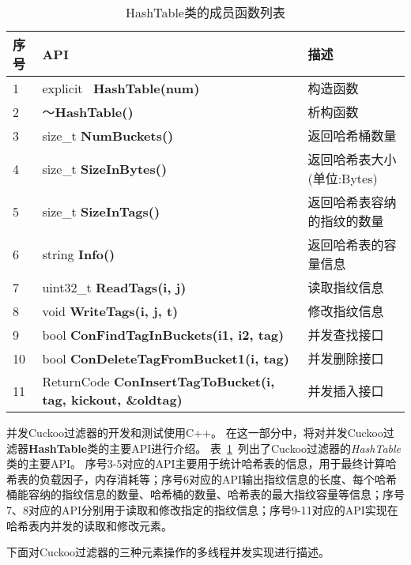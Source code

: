 \begin{table}[htbp]
  \caption{HashTable类的成员函数列表}
\label{tab:cbf_API}
\footnotesize
\centering
\begin{tabular}{lll}
\toprule
序号&API &   描述  \\
\midrule
1	&	explicit ~\textbf{HashTable(num)}									 	&  	构造函数\\
2	&	 ～\textbf{HashTable()}  									& 	析构函数\\
3	&	size\_t  \textbf{NumBuckets()} 									&  	返回哈希桶数量\\
4	&	size\_t  \textbf{SizeInBytes() }									&  	返回哈希表大小(单位:Bytes)\\
5	&	size\_t  \textbf{SizeInTags()} 									&  	返回哈希表容纳的指纹的数量\\
6	&	string   \textbf{Info()} 											&  	返回哈希表的容量信息\\
7	&	uint32\_t  \textbf{ReadTags(i, j)}										&  	读取指纹信息\\
8	&	void  \textbf{WriteTags(i, j, t)} 										&  	修改指纹信息\\
9	&	bool  \textbf{ ConFindTagInBuckets(i1, i2, tag) }			& 	并发查找接口\\
10	&	bool  \textbf{ ConDeleteTagFromBucket1(i, tag)	}			& 	并发删除接口\\
11	&	ReturnCode  \textbf{ ConInsertTagToBucket(i, tag, kickout, \&oldtag) }	& 并发插入接口\\
\bottomrule
\end{tabular}
\end{table}

并发Cuckoo过滤器的开发和测试使用C++。
在这一部分中，将对并发Cuckoo过滤器\textbf{HashTable}类的主要API进行介绍。
表~\ref{tab:cbf_API}~列出了Cuckoo过滤器的\textit{HashTable}类的主要API。
序号3-5对应的API主要用于统计哈希表的信息，用于最终计算哈希表的负载因子，内存消耗等；序号6对应的API输出指纹信息的长度、每个哈希桶能容纳的指纹信息的数量、哈希桶的数量、哈希表的最大指纹容量等信息；序号7、8对应的API分别用于读取和修改指定的指纹信息；序号9-11对应的API实现在哈希表内并发的读取和修改元素。

下面对Cuckoo过滤器的三种元素操作的多线程并发实现进行描述。

